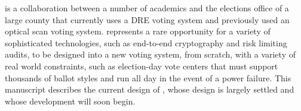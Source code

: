 \projname is a collaboration between a number of academics and
the elections office of a large county that currently uses a DRE
voting system and previously used an optical scan voting system. 
\projname represents a rare opportunity for a variety of
sophisticated technologies, such as end-to-end cryptography and risk limiting
audits, to be designed into a new voting system, from scratch, with
a variety of real world constraints, such as election-day vote centers
that must support thousands of ballot styles and run
all day in the event of a power failure. This manuscript describes the
current design of \projname, whose design is largely settled and whose
development will soon begin.


